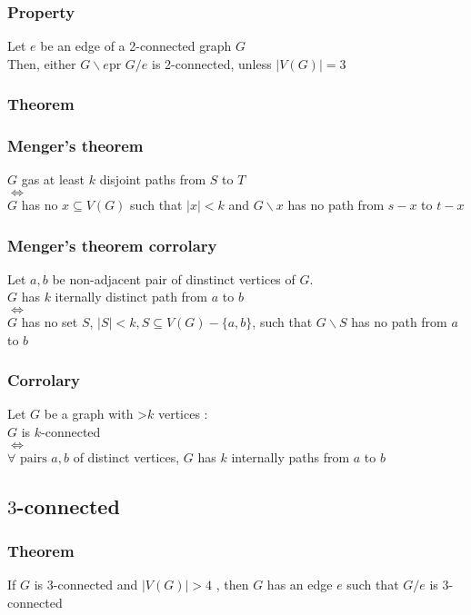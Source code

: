            \subsubsection{Property}
                Let $e$ be an edge of a 2-connected graph $G$\\
                Then, either $G\backslash e$pr $G/e$ is 2-connected, unless $|V(G)|=3$
            \subsubsection{Theorem}%
            \subsubsection{Menger's theorem}
                $G$ gas at least $k$ disjoint paths from $S$ to $T$\\
                $\Leftrightarrow$\\
                $G$ has no $x\subseteq V(G)$ such that $|x|<k$ and $G\backslash x$ has no path from $s-x$ to $t-x$
            \subsubsection{Menger's theorem corrolary}
                Let $a, b$ be non-adjacent pair of dinstinct vertices of $G$.\\
                $G$ has $k$ iternally distinct path from $a$ to $b$\\
                $\Leftrightarrow$\\
                $G$ has no set $S$, $|S|<k, S\subseteq V(G)-\{a, b\}$, such that $G\backslash S$ has no path from $a$ to $b$
            \subsubsection{Corrolary}
                Let $G$ be a graph with >$k$ vertices :\\
                $G$ is $k$-connected\\
                $\Leftrightarrow$\\
                $\forall\text{ pairs }a,b$ of distinct vertices, $G$ has $k$ internally paths from $a$ to $b$
        \subsection{$3$-connected}
            \subsubsection{Theorem}
                If $G$ is $3$-connected and $|V(G)|>4$ , then $G$ has an edge $e$ such that $G/e$ is $3$-connected
